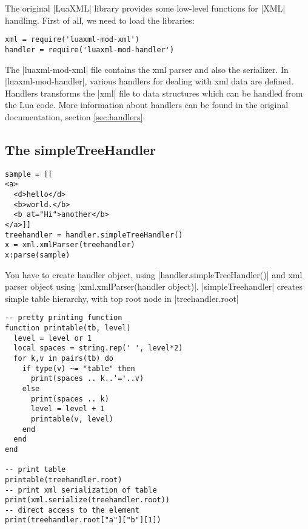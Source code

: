 \documentclass{ltxdoc}
\begin{document}


The original |LuaXML| library provides some low-level functions for |XML| handling.
First of all, we need to load the libraries:

\begin{verbatim}
xml = require('luaxml-mod-xml')
handler = require('luaxml-mod-handler')
\end{verbatim} 


The |luaxml-mod-xml| file contains the  xml parser and also the serializer. In
|luaxml-mod-handler|, various handlers for dealing with xml data are defined.
Handlers transforms the |xml| file to data structures which can be handled from
the Lua code. More information about handlers can be found in the original
documentation, section \ref{sec:handlers}.

\subsection{The simpleTreeHandler} 
\begin{verbatim}
sample = [[
<a>
  <d>hello</d>
  <b>world.</b>
  <b at="Hi">another</b>
</a>]]
treehandler = handler.simpleTreeHandler()
x = xml.xmlParser(treehandler)
x:parse(sample)
\end{verbatim} 

You have to create handler object, using |handler.simpleTreeHandler()| and xml
parser object using |xml.xmlParser(handler object)|. |simpleTreehandler|
creates simple table hierarchy, with top root node in |treehandler.root|

\begin{verbatim}
-- pretty printing function
function printable(tb, level)
  level = level or 1
  local spaces = string.rep(' ', level*2)
  for k,v in pairs(tb) do
    if type(v) ~= "table" then
      print(spaces .. k..'='..v)
    else
      print(spaces .. k)
      level = level + 1
      printable(v, level)
    end
  end
end

-- print table
printable(treehandler.root)
-- print xml serialization of table
print(xml.serialize(treehandler.root))
-- direct access to the element
print(treehandler.root["a"]["b"][1])
\end{verbatim}
\end{document}
